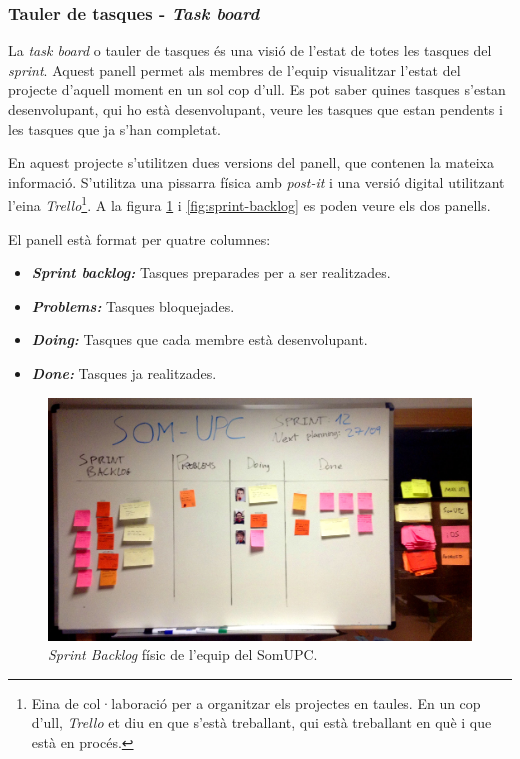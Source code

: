 
\subsubsection{Tauler de tasques - \textit{Task board}}

La \textit{task board} o tauler de tasques és una visió de l'estat de totes les tasques del \textit{sprint}. Aquest panell permet als membres de l'equip visualitzar l'estat del projecte d'aquell moment en un sol cop d'ull. Es pot saber quines tasques s'estan desenvolupant, qui ho està desenvolupant, veure les tasques que estan pendents i les tasques que ja s'han completat.

En aquest projecte s'utilitzen dues versions del panell, que contenen la mateixa informació. S'utilitza una pissarra física amb \textit{post-it} i una versió digital utilitzant l'eina \textit{Trello}\footnote{Eina de col·laboració per a organitzar els projectes en taules. En un cop d'ull, \textit{Trello} et diu en que s'està treballant, qui està treballant en què i que està en procés.}. A la figura \ref{fig:sprint-backlog-real} i \ref{fig:sprint-backlog} es poden veure els dos panells.

El panell està format per quatre columnes:

\begin{itemize}
    \item \textbf{\textit{Sprint backlog:}} Tasques preparades per a ser realitzades.
    \item \textbf{\textit{Problems:}} Tasques bloquejades.
    \item \textbf{\textit{Doing:}} Tasques que cada membre està desenvolupant.
    \item \textbf{\textit{Done:}} Tasques ja realitzades.
\end{itemize}


\begin{figure}[ht]
    \centering
    \includegraphics*[scale=0.2]{GestioProjecte/Metodologia/task-board.jpg}
    \caption{\textit{Sprint Backlog} físic de l'equip del SomUPC.}
    \label{fig:sprint-backlog-real}
\end{figure}

